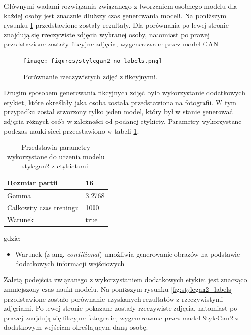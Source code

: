 \documentclass[eng,printmode]{mgr}
\begin{document}
Głównymi wadami rozwiązania związanego z tworzeniem osobnego modelu dla każdej osoby jest znacznie dłuższy czas generowania modeli. Na poniższym rysunku \ref{fig:stylegan2_no_labels} przedstawione zostały rezultaty. Dla porównania po lewej stronie znajdują się rzeczywiste zdjęcia wybranej osoby, natomiast po prawej przedstawione zostały fikcyjne zdjęcia, wygenerowane przez model GAN. 


\begin{figure}[H]
	\centering
	\texttt{[image: figures/stylegan2\_no\_labels.png]}
	\caption{Porównanie rzeczywistych zdjęć z fikcyjnymi.}
	\label{fig:stylegan2_no_labels}
\end{figure}



Drugim sposobem generowania fikcyjnych zdjęć było wykorzystanie dodatkowych etykiet, które określały jaka osoba została przedstawiona na fotografii. W tym przypadku został stworzony tylko jeden model, który był w stanie generować zdjęcia różnych osób w zależności od podanej etykiety. Parametry wykorzystane podczas nauki sieci przedstawiono w tabeli \ref{tab:parametry_2}.

\begin{table}[H]
\centering
\small
\begin{tabular}{|l|l|}
\hline
Rozmiar partii          & 16     \\ \hline
Gamma                   & 3.2768 \\ \hline
Całkowity czas treningu & 1000   \\ \hline
Warunek                 & true   \\ \hline
\end{tabular}
\caption{Przedstawia parametry wykorzystane do uczenia modelu stylegan2 z etykietami.}
 \label{tab:parametry_2} 
\end{table}

\newpage

gdzie:   

\begin{itemize}

\item Warunek (z ang. \textit{conditional}) umożliwia generowanie obrazów na podstawie dodatkowych informacji wejściowych.

\end{itemize}

Zaletą podejścia związanego z wykorzystaniem dodatkowych etykiet jest znacząco zmniejszony czas nauki modelu. Na poniższym rysunku \ref{fig:stylegan2_labels} przedstawione zostało porównanie uzyskanych rezultatów z rzeczywistymi zdjęciami. Po lewej stronie pokazane zostały rzeczywiste zdjęcia, natomiast po prawej znajdują się fikcyjne fotografie, wygenerowane przez model StyleGan2 z dodatkowym wejściem określającym daną osobę.
\end{document}
